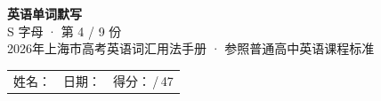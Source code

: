 \documentclass[10pt,a4paper]{article}
\begin{document}
\pagestyle{plain}

\begin{center}
{\LARGE\bfseries 英语单词默写}\\[0.22em]
{\large S 字母 · 第 4 / 9 份}\\[0.18em]
{\small 2026年上海市高考英语词汇用法手册 · 参照普通高中英语课程标准}
\end{center}

\vspace{0.25em}
\noindent\begin{tabular}{@{}p{}@{}p{}@{}p{}@{}}
姓名：\underline{\hspace{2.0cm}} & 日期：\underline{\hspace{2.0cm}} & 得分：\underline{\hspace{1.3cm}}\,/\,47 \\
\end{tabular}

\vspace{0.3em}

\vspace{0.08em}
\end{document}
